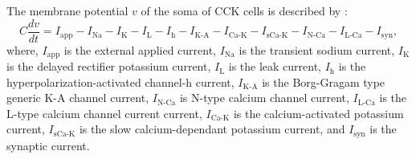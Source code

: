 \documentclass[../main.tex]{subfiles}
\begin{document}
The membrane potential $v$ of the soma of CCK cells is described by \citep{bilash_lateral_2023,cutsuridis_hippocampal_2018,aradi_role_1999}:
\begin{equation}
 C\displaystyle\frac{dv}{dt} = I_{\text{app}}-I_{\text{Na}} - I_{\text{K}} - I_{\text{L}} - I_{\text{h}} - I_{\text{K-A}}- I_{\text{Ca-K}}- I_{\text{sCa-K}}-I_{\text{N-Ca}}-I_{\text{L-Ca}}-I_{\text{syn}},
    \label{eq:cck-dynamics}
\end{equation}
where, $I_\text{app}$ is the external applied current, $I_\text{Na}$ is the transient sodium current, $I_\text{K}$ is the delayed rectifier potassium current, $I_\text{L}$ is the leak current, $I_\text{h}$ is the hyperpolarization-activated channel-h current, $I_\text{K-A}$ is the Borg-Gragam type generic K-A channel current, $I_\text{N-Ca}$ is N-type calcium channel current, $I_\text{L-Ca}$ is the L-type calcium channel current current, $I_\text{Ca-K}$ is the calcium-activated potassium current, $I_\text{sCa-K}$ is the slow calcium-dependant potassium current, and $I_\text{syn}$ is the synaptic current.
\end{document}
